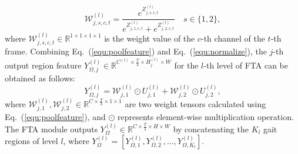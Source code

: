 \documentclass[10pt,twocolumn,letterpaper]{article}
\begin{document}
\begin{equation}
  \label{equ:normalize}
       \mathcal{W}_{j,s,c,t}^{(l)}=\frac{e^{Z_{j,s,c,t}^{(l)}}}{e^{Z_{j,1,c,t}^{(l)}}+e^{Z_{j,2,c,t}^{(l)}}}   \quad s\in \{1,2\},
 \end{equation}
where $\mathcal{W}_{j,s,c,t}^{(l)} \in \mathbb{R}^{1 \times 1 \times 1 \times 1}$ is the weight value of the $c$-th channel of the $t$-th frame.
Combining Eq.~(\ref{equ:poolfeature}) and Eq.~(\ref{equ:normalize}), the $j$-th output region feature $Y_{\Omega,j}^{(l)} \in \mathbb{R}^{C^{(l)} \times \frac{T}{3} \times H_j^{(l)} \times W}$ for the $l$-th level of FTA can be obtained as follows:
\begin{equation}
    Y_{\Omega,j}^{(l)}=\mathcal{W}_{j,1}^{(l)}\odot U_{j,1}^{(l)}+\mathcal{W}_{j,2}^{(l)}\odot U_{j,2}^{(l)},
\end{equation}
where $\mathcal{W}_{j,1}^{(l)}, \mathcal{W}_{j,2}^{(l)} \in \mathbb{R}^{C \times \frac{T}{3} \times 1 \times 1}$ are two weight tensors calculated using Eq.~(\ref{equ:poolfeature}), and $\odot$ represents element-wise multiplication operation. The FTA module outputs $Y^{(l)}_{\Omega}\in \mathbb{R}^{C \times \frac{T}{3} \times H \times W}$ by concatenating the $K_l$ gait regions of level $l$, where $Y^{(l)}_{\Omega}=\left[Y_{\Omega,1}^{(l)},Y_{\Omega,2}^{(l)},\ldots,Y_{\Omega,K_l}^{(l)}\right]$.















\end{document}
